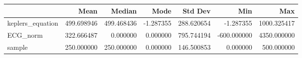 \begin{tabular}{lrrrrrr}
\toprule
 & Mean & Median & Mode & Std Dev & Min & Max \\
\midrule
keplers_equation & 499.698946 & 499.468436 & -1.287355 & 288.620654 & -1.287355 & 1000.325417 \\
ECG_norm & 322.666487 & 0.000000 & 0.000000 & 795.744194 & -600.000000 & 4350.000000 \\
sample & 250.000000 & 250.000000 & 0.000000 & 146.500853 & 0.000000 & 500.000000 \\
\bottomrule
\end{tabular}
